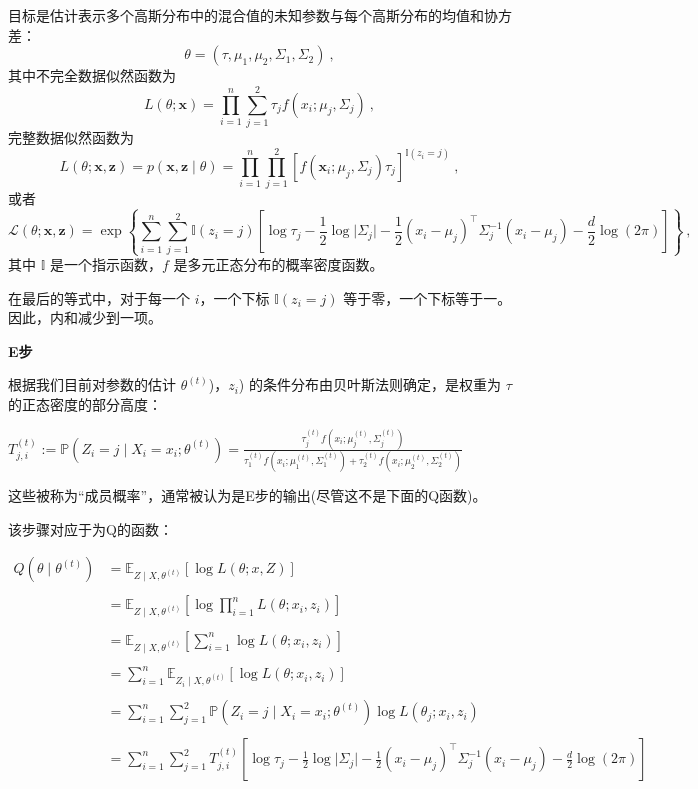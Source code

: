 目标是估计表示多个高斯分布中的混合值的未知参数与每个高斯分布的均值和协方差：
\begin{equation}
\theta = (\tau, \mu_1, \mu_2, \Sigma_1, \Sigma_2)~,
\end{equation}
其中不完全数据似然函数为
$$L(\theta; \mathbf{x}) = \prod_{i=1}^{n} \sum_{j=1}^{2} \tau_j f \left( x_i; \mu_j, \Sigma_j \right)~,$$
完整数据似然函数为
\begin{equation}
L(\theta; \mathbf{x}, \mathbf{z}) = p(\mathbf{x}, \mathbf{z} \mid \theta) = \prod_{i=1}^{n} \prod_{j=1}^{2} \left[ f(\mathbf{x}_i; \mu_j, \Sigma_j) \tau_j \right]^{\mathbb{I}(z_i = j)}~,
\end{equation}
或者
\begin{equation}
\mathcal{L}(\theta; \mathbf{x}, \mathbf{z}) = \exp \left\{\sum_{i=1}^{n} \sum_{j=1}^{2} \mathbb{I}(z_i = j)\left[\log \tau_j - \frac{1}{2} \log \lvert \Sigma_j \rvert - \frac{1}{2} (x_i - \mu_j)^\top \Sigma_j^{-1} (x_i - \mu_j) - \frac{d}{2} \log(2\pi)\right]\right\}~,
\end{equation}
其中 $\mathbb{I}$ 是一个指示函数，$f$ 是多元正态分布的概率密度函数。

在最后的等式中，对于每一个 $i$，一个下标 $\mathbb{I}(z_i = j)$ 等于零，一个下标等于一。因此，内和减少到一项。

\textbf{E步}

根据我们目前对参数的估计 $\theta^{(t)}$)，$z_i$) 的条件分布由贝叶斯法则确定，是权重为 $\tau$ 的正态密度的部分高度：

$T_{j,i}^{(t)} := \mathbb{P}(Z_i = j \mid X_i = x_i; \theta^{(t)}) = \frac{ \tau_j^{(t)} f(x_i; \mu_j^{(t)}, \Sigma_j^{(t)})}{ \tau_1^{(t)} f(x_i; \mu_1^{(t)}, \Sigma_1^{(t)}) + \tau_2^{(t)} f(x_i; \mu_2^{(t)}, \Sigma_2^{(t)}) }$

这些被称为“成员概率”，通常被认为是E步的输出(尽管这不是下面的Q函数)。

该步骤对应于为Q的函数：

\begin{align}
Q(\theta \mid \theta^{(t)}) &= \mathbb{E}_{Z \mid X, \theta^{(t)}}[\log L(\theta; x, Z)] \\\\
&= \mathbb{E}_{Z \mid X, \theta^{(t)}}\left[\log \prod_{i=1}^{n} L(\theta; x_i, z_i)\right] \\\\
&= \mathbb{E}_{Z \mid X, \theta^{(t)}}\left[\sum_{i=1}^{n} \log L(\theta; x_i, z_i)\right] \\\\
&= \sum_{i=1}^{n} \mathbb{E}_{Z_i \mid X, \theta^{(t)}}[\log L(\theta; x_i, z_i)] \\\\
&= \sum_{i=1}^{n} \sum_{j=1}^{2} \mathbb{P}(Z_i = j \mid X_i = x_i; \theta^{(t)}) \log L(\theta_j; x_i, z_i) \\\\
&= \sum_{i=1}^{n} \sum_{j=1}^{2} T_{j,i}^{(t)} \left[\log \tau_j - \frac{1}{2} \log \lvert \Sigma_j \rvert - \frac{1}{2} (x_i - \mu_j)^\top \Sigma_j^{-1} (x_i - \mu_j) - \frac{d}{2} \log(2\pi)\right]~
\end{align}

